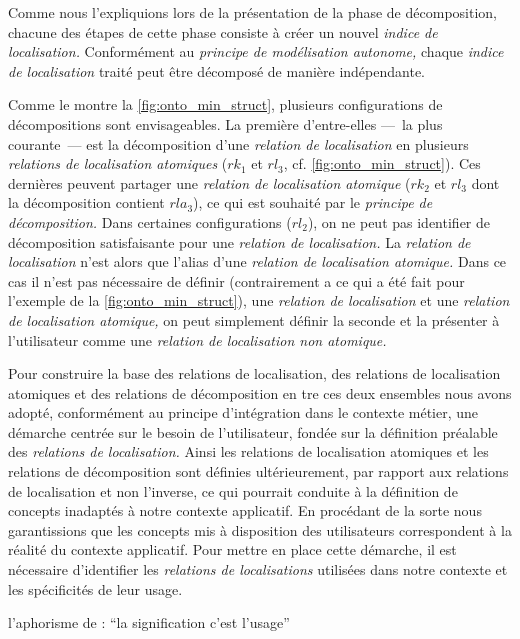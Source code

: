 Comme nous l'expliquions lors de la présentation de la phase de
décomposition, chacune des étapes de cette phase consiste à créer un
nouvel \emph{indice de localisation.} Conformément au \emph{principe
  de modélisation autonome,} chaque \emph{indice de localisation}
traité peut être décomposé de manière indépendante.

Comme le montre la \autoref{fig:onto_min_struct}, plusieurs
configurations de décompositions sont envisageables. La première
d'entre-elles ---~la plus courante~--- est la décomposition d'une
\emph{relation de localisation} en plusieurs \emph{relations de
  localisation atomiques} (\eg \(rk_1\) et \(rl_3\),
cf. \autoref{fig:onto_min_struct}).
%
Ces dernières peuvent partager une \emph{relation de localisation
  atomique} (\eg \(rk_2\) et \(rl_3\) dont la décomposition contient
\(rla_3\)), ce qui est souhaité par le \emph{principe de
  décomposition.}
%
Dans certaines configurations (\eg \(rl_2\)), on ne peut pas
identifier de décomposition satisfaisante pour une \emph{relation de
  localisation.} La \emph{relation de localisation} n'est alors que
l'alias d'une \emph{relation de localisation atomique.} Dans ce cas il
n'est pas nécessaire de définir (contrairement a ce qui a été fait
pour l'exemple de la \autoref{fig:onto_min_struct}), une
\emph{relation de localisation} et une \emph{relation de localisation
  atomique,} on peut simplement définir la seconde et la présenter à
l'utilisateur comme une \emph{relation de localisation non atomique.}

Pour construire la base des relations de localisation, des relations
de localisation atomiques et des relations de décomposition en tre ces
deux ensembles nous avons adopté, conformément au principe
d'intégration dans le contexte métier, une démarche centrée sur le
besoin de l'utilisateur, \ie fondée sur la définition préalable des
\emph{relations de localisation.} Ainsi les relations de localisation
atomiques et les relations de décomposition sont définies
ultérieurement, par rapport aux relations de localisation et non
l'inverse, ce qui pourrait conduite à la définition de concepts
inadaptés à notre contexte applicatif.  En procédant de la sorte nous
garantissions que les concepts mis à disposition des utilisateurs
correspondent à la réalité du contexte applicatif. Pour mettre en
place cette démarche, il est nécessaire d'identifier les
\emph{relations de localisations} utilisées dans notre contexte et les
spécificités de leur usage.

l'aphorisme de  : \enquote{la signification c'est
  l'usage}


